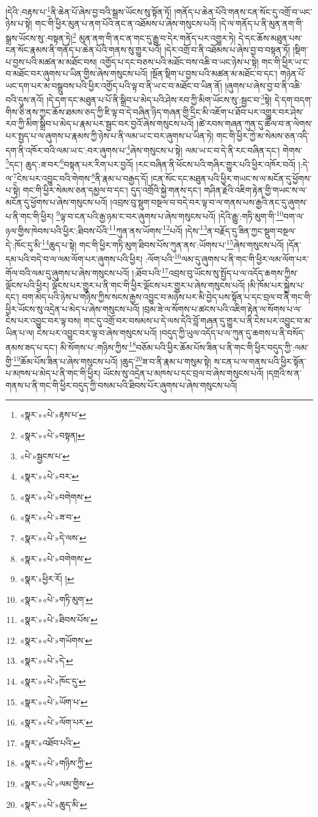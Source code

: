 །དེའི་:བརྟས་པ་\footnote{«སྣར་»«པེ་»རྟས་པ་}ནི་ཆེན་པོ་ཞེས་བྱ་བའི་སྒྲས་ཡོངས་སུ་སྟོན་ཏོ། །གནོད་པ་ཆེན་པོའི་གནས་ངན་སོང་དུ་འགྲོ་བ་ཡང་ཉེས་པ་སྟེ། གང་གི་ཕྱིར་མུན་པ་ནག་པོའི་ནང་ན་འཐོམས་པ་ཞེས་གསུངས་པའོ། །དེ་ལ་གནོད་པ་ནི་མུན་ནག་གི་སྒྲས་ཡོངས་སུ་:བསྟན་ཏེ།\footnote{«སྣར་»«པེ་»བསྟན།} མུན་ནག་གི་ནང་ན་གང་དུ་རྒྱུ་བ་དེར་གནོད་པར་འགྱུར་ཏེ། དེ་དང་ཆོས་མཐུན་པས་ངན་སོང་རྣམས་ནི་གནོད་པ་ཆེན་པོའི་གནས་སུ་གྱུར་པའོ། །དེར་འགྲོ་བ་ནི་འཐོམས་པ་ཞེས་བྱ་བ་བསྟན་ཏོ། །སྡིག་པ་བྱས་པའི་མཚན་མ་མཐོང་བས། འགྱོད་པ་དང་བཅས་པའི་མཐོང་བས་འཆི་བ་ཡང་ཉེས་པ་སྟེ། གང་གི་ཕྱིར་ཡ་ང་བ་མཐོང་བར་ཞུགས་པ་ཡིན་གྱིས་ཞེས་གསུངས་པའོ། །སྔོན་སྡིག་པ་བྱས་པའི་མཚན་མ་མཐོང་བ་དང་། གཉེན་པོ་ཡང་དག་པར་མ་བསྒྲུབས་པའི་ཕྱིར་འགྱོད་པའི་ལྟ་བ་ནི་ཡ་ང་བ་མཐོང་བ་ཡིན་ནོ། །ཞུགས་པ་ཞེས་བྱ་བ་ནི་འཆི་བའི་དུས་ནའོ། །དེ་དག་དང་མཐུན་པ་པོ་ནི་སྒྲིབ་པ་མེད་པའི་ཤེས་རབ་ཀྱི་མིག་ཡོངས་སུ་:སྦྱང་བ་\footnote{«པེ་»སྦྱངས་པ་}སྟེ། དེ་དག་བདག་གིས་ཅི་ནས་ཀྱང་ཆོས་ཐམས་ཅད་ཀྱི་ཇི་ལྟ་བ་དེ་བཞིན་ཉིད་གཞན་གྱི་དྲིང་མི་འཇོག་པ་ཐོབ་པར་འགྱུར་བར་ཤེས་རབ་ཀྱི་མིག་སྒྲིབ་པ་མེད་པ་རྣམ་པར་སྦྱང་བར་བྱའོ་ཞེས་གསུངས་པའོ། །ཚེ་རབས་གཞན་ཀུན་དུ་ཚོལ་བ་ན་ལེགས་པར་སྤྱད་པ་ལ་ཞུགས་པ་རྣམས་ཀྱི་ཉེས་པ་ནི་ལམ་ཡ་ང་བར་ཞུགས་པ་ཡིན་ཏེ། གང་གི་ཕྱིར་ཀྱེ་མ་སེམས་ཅན་འདི་དག་ནི་འཁོར་བའི་ལམ་ཡ་ང་:བར་ཞུགས་པ་\footnote{«སྣར་»«པེ་»བར་}ཞེས་གསུངས་པ་སྟེ། ལམ་ཡ་ང་བ་དེ་ནི་རང་བཞིན་དང་། གེགས་\footnote{«སྣར་»«པེ་»བགེགས་}དང་། ཆུད་:ཟ་བར་\footnote{«སྣར་»«པེ་»ཟ་བ་}བསྟན་པར་རིག་པར་བྱའོ། །རང་བཞིན་ནི་ཕོངས་པའི་གཞིར་གྱུར་པའི་ཕྱིར་འཁོར་བའོ། །:དེ་ལ་\footnote{«སྣར་»«པེ་»དེ་ལས་}ངེས་པར་འབྱུང་བའི་གེགས་\footnote{«སྣར་»«པེ་»བགེགས་}ནི་རྣམ་པ་བརྒྱད་དོ། །ངན་སོང་དང་མཐུན་པའི་ཕྱིར་གཡང་ས་ལ་མངོན་དུ་ཕྱོགས་པ་སྟེ། གང་གི་ཕྱིར་སེམས་ཅན་དམྱལ་བ་དང་། དུད་འགྲོའི་སྐྱེ་གནས་དང་། གཤིན་རྗེའི་འཇིག་རྟེན་གྱི་གཡང་ས་ལ་མངོན་དུ་ཕྱོགས་པ་ཞེས་གསུངས་པའོ། །འབྲས་བུ་སྡུག་བསྔལ་བ་བདེ་བར་ལྟ་བ་ལ་གནས་པས་རྒྱའི་ནང་དུ་ཞུགས་པ་ནི་གང་གི་ཕྱིར། \footnote{«སྣར་»ཕྱིར་རོ། ། }ལྟ་བ་ངན་པའི་རྒྱ་ཉམ་ང་བར་ཞུགས་པ་ཞེས་གསུངས་པའོ། །དེའི་རྒྱུ་:གཏི་མུག་གི་\footnote{«སྣར་»«པེ་»གཏི་མུག་}བག་ལ་ཉལ་གྱིས་ཁེབས་པའི་ཕྱིར་:ཐིབས་པོའི་\footnote{«སྣར་»«པེ་»ཐིབས་པོས་}ཀུན་ནས་ཡོགས་\footnote{«སྣར་»«པེ་»གཡོགས་}པའོ། །དེས་\footnote{«སྣར་»«པེ་»དེ་}ན་བརྗོད་དུ་ཟིན་ཀྱང་སྡུག་བསྔལ་དེ་:ཁོང་དུ་མི་\footnote{«སྣར་»«པེ་»ཁོང་དུ་}ཆུད་པ་སྟེ། གང་གི་ཕྱིར་གཏི་མུག་ཐིབས་པོས་ཀུན་ནས་:ཡོགས་པ་\footnote{«སྣར་»«པེ་»ཡོག་པ་}ཞེས་གསུངས་པའོ། །དོན་དམ་པའི་བདེ་བ་ལ་ལམ་ལོག་པར་ཞུགས་པའི་ཕྱིར། :ལོག་པའི་\footnote{«སྣར་»«པེ་»ལོག་པར་}ལམ་དུ་ཞུགས་པ་ནི་གང་གི་ཕྱིར་ལམ་ལོག་པར་གོལ་བའི་ལམ་དུ་ཞུགས་པ་ཞེས་གསུངས་པའོ། །:ཐོབ་པའི་\footnote{«སྣར་»འཐོབ་པའི་}འབྲས་བུ་ཡོངས་སུ་སྤྱོད་པ་ལ་འདོད་ཆགས་ཀྱིས་ལྡོངས་པའི་ཕྱིར། ལྡོངས་པར་གྱུར་པ་ནི་གང་གི་ཕྱིར་ལྡོངས་པར་གྱུར་པ་ཞེས་གསུངས་པའོ། །མི་ཁོམ་པར་སྐྱེས་པ་དང་། བག་མེད་པའི་ཉེས་པ་གཉིས་ཀྱིས་སངས་རྒྱས་འབྱུང་བ་མཉེས་པར་མི་བྱེད་པས་སྟོན་པ་དང་བྲལ་བ་ནི་གང་གི་ཕྱིར་ཡོངས་སུ་འདྲེན་པ་མེད་པ་ཞེས་གསུངས་པའོ། །བྲམ་ཟེ་ལ་སོགས་པ་ཚངས་པའི་འཇིག་རྟེན་ལ་སོགས་པ་ལ་ངེས་པར་འབྱུང་བར་ལྟ་བས། གང་དུ་འགྲོ་བར་བསམས་པ་དེ་ལས་དེའི་བློ་གཞན་དུ་གྱུར་པ་ནི་ངེས་པར་འབྱུང་བ་མ་ཡིན་པ་ལ། ངེས་པར་འབྱུང་བར་ལྟ་བ་ཞེས་གསུངས་པའོ། །བདུད་ཀྱི་ཡུལ་འདོད་པ་ལ་ཀུན་དུ་ཆགས་པ་ནི་བསོད་ནམས་ཟད་པ་དང་། མི་སོགས་པ་:གཉིས་ཀྱིས་\footnote{«སྣར་»«པེ་»གཉིས་ཀྱི་}བཅོམ་པའི་ཕྱིར་ཆོམ་པོས་ཟིན་པ་ནི་གང་གི་ཕྱིར་བདུད་ཀྱི་:ལམ་གྱི་\footnote{«སྣར་»«པེ་»ལམ་གྱིས་}ཆོམ་པོས་ཟིན་པ་ཞེས་གསུངས་པའོ། །ཆུད་\footnote{«སྣར་»«པེ་»ཆུད་མི་}ཟ་བ་ནི་རྣམ་པ་གསུམ་སྟེ། ས་ངན་པ་ལ་གནས་པའི་ཕྱིར་སྟོན་པ་མཁས་པ་མེད་པ་ནི་གང་གི་ཕྱིར། ཡོངས་སུ་འདྲེན་པ་མཁས་པ་དང་བྲལ་བ་ཞེས་གསུངས་པའོ། །དགྲའི་ས་ན་གནས་པ་ནི་གང་གི་ཕྱིར་བདུད་ཀྱི་བསམ་པའི་ཐིབས་པོར་ཞུགས་པ་ཞེས་གསུངས་པའོ། 